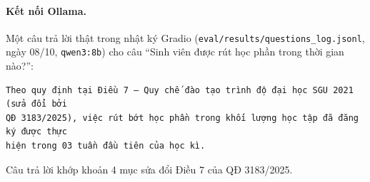 \paragraph{Kết nối Ollama.} Một câu trả lời thật trong nhật ký Gradio (\texttt{eval/results/questions\_log.jsonl},
ngày 08/10, \texttt{qwen3:8b}) cho câu ``Sinh viên được rút học phần trong thời gian nào?'':

\begin{lstlisting}[caption={Câu trả lời mẫu qua Ollama.}, label={lst:ollama-mau}]
Theo quy định tại Điều 7 — Quy chế đào tạo trình độ đại học SGU 2021 (sửa đổi bởi
QĐ 3183/2025), việc rút bớt học phần trong khối lượng học tập đã đăng ký được thực
hiện trong 03 tuần đầu tiên của học kì.
\end{lstlisting}

Câu trả lời khớp khoản 4 mục sửa đổi Điều 7 của QĐ 3183/2025.
